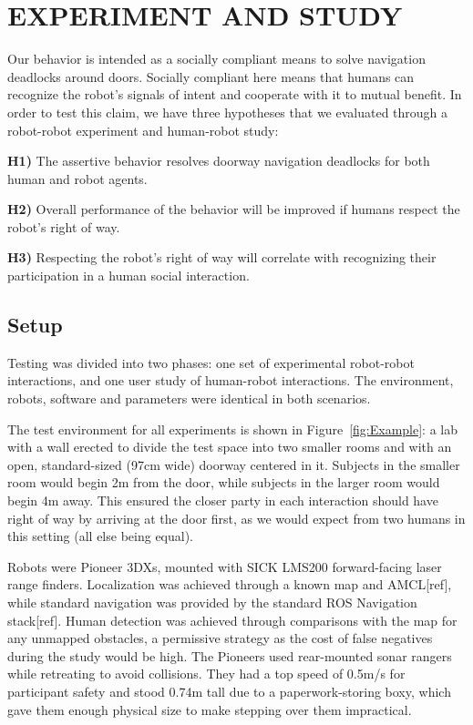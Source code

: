 \documentclass[letterpaper, 10 pt, conference]{ieeeconf}  %
\begin{document}

\section{EXPERIMENT AND STUDY}

Our behavior is intended as a socially compliant means to solve navigation deadlocks around doors. Socially compliant here means that humans can recognize the robot's signals of intent and cooperate with it to mutual benefit. In order to test this claim, we have three hypotheses that we evaluated through a robot-robot experiment and human-robot study:

\textbf{H1)} The assertive behavior resolves doorway navigation deadlocks for both human and robot agents.

\textbf{H2)} Overall performance of the behavior will be improved if humans respect the robot's right of way.

\textbf{H3)} Respecting the robot's right of way will correlate with recognizing their participation in a human social interaction.


\subsection{Setup}

Testing was divided into two phases: one set of experimental robot-robot interactions, and one user study of human-robot interactions. The environment, robots, software and parameters were identical in both scenarios.

The test environment for all experiments is shown in Figure~\ref{fig:Example}: a lab with a wall erected to divide the test space into two smaller rooms and with an open, standard-sized (97cm wide) doorway centered in it. Subjects in the smaller room would begin 2m from the door, while subjects in the larger room would begin 4m away. This ensured the closer party in each interaction should have right of way by arriving at the door first, as we would expect from two humans in this setting (all else being equal).


Robots were Pioneer 3DXs, mounted with SICK LMS200 forward-facing laser range finders. Localization was achieved through a known map and AMCL[ref], while standard navigation was provided by the standard ROS Navigation stack[ref]. Human detection was achieved through comparisons with the map for any unmapped obstacles, a permissive strategy as the cost of false negatives during the study would be high. The Pioneers used rear-mounted sonar rangers while retreating to avoid collisions. They had a top speed of 0.5m/s for participant safety and stood 0.74m tall due to a paperwork-storing boxy, which gave them enough physical size to make stepping over them impractical.
\end{document}
